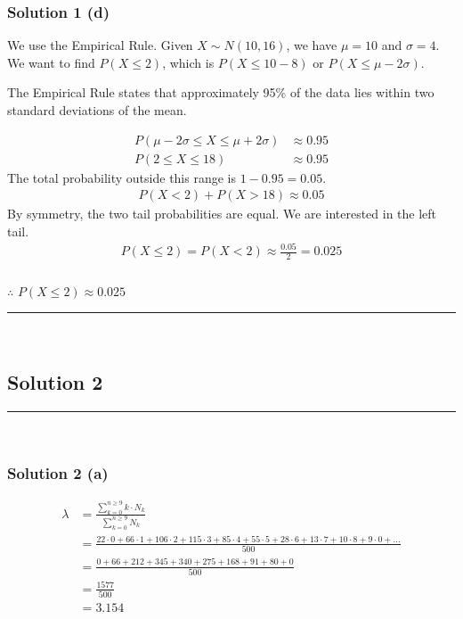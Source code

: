 \documentclass{article}
\begin{document}
\subsubsection*{Solution 1 (d)}
We use the Empirical Rule. Given $X \sim N(10, 16)$, we have $\mu = 10$ and $\sigma = 4$.
We want to find $P(X \leq 2)$, which is $P(X \leq 10 - 8)$ or $P(X \leq \mu - 2\sigma)$.


\begin{flushleft}
    The Empirical Rule states that approximately 95\% of the data lies within two standard deviations of the mean.
\end{flushleft}
\begin{align*}
    P(\mu - 2\sigma \leq X \leq \mu + 2\sigma) &\approx 0.95 \\
    P(2 \leq X \leq 18) &\approx 0.95
\end{align*}
The total probability outside this range is $1 - 0.95 = 0.05$.
\begin{align*}
    P(X < 2) + P(X > 18) \approx 0.05
\end{align*}
By symmetry, the two tail probabilities are equal. We are interested in the left tail.
\begin{align*}
    P(X \leq 2) = P(X < 2) \approx \frac{0.05}{2} = 0.025
\end{align*}

\subsubsection*{\normalfont}{$\therefore$ $P(X \leq 2) \approx 0.025$}

\noindent\rule{\textwidth}{0.4pt}\\

\newpage

\subsection*{Solution 2}
\noindent\rule{\textwidth}{0.4pt}\\
\subsubsection*{Solution 2 (a)}
\begin{align*}
    \lambda &= \frac{\sum_{k=0}^{n\geq 9} k \cdot N_k}{\sum_{k=0}^{n\geq 9} N_k} \\
    &= \frac{22 \cdot 0 + 66 \cdot 1 + 106 \cdot 2 + 115 \cdot 3 + 85 \cdot 4 + 55 \cdot 5 + 28 \cdot 6 + 13 \cdot 7 + 10 \cdot 8 + 9 \cdot 0 + \dots}{500} \\
    &= \frac{0 + 66 + 212 + 345 + 340 + 275 + 168 + 91 + 80 + 0}{500} \\
    &= \frac{1577}{500} \\
    &= 3.154
\end{align*}
\end{document}
